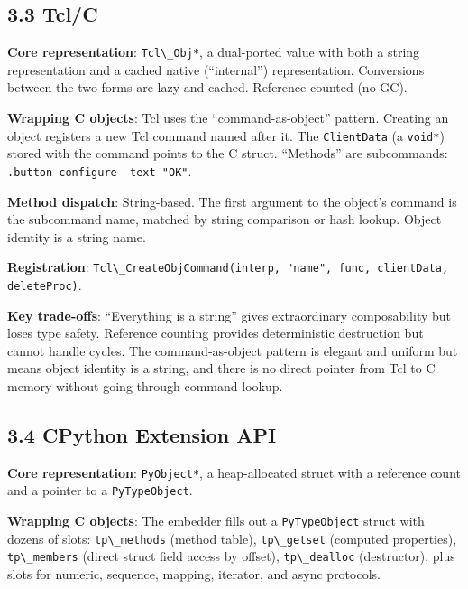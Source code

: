 \documentclass[
  12pt,
]{report}
\newcommand{\passthrough}[1]{#1}
\begin{document}
\subsection{3.3 Tcl/C}\label{tclc}

\textbf{Core representation}: \passthrough{\lstinline!Tcl\_Obj*!}, a
dual-ported value with both a string representation and a cached native
(``internal'') representation. Conversions between the two forms are
lazy and cached. Reference counted (no GC).

\textbf{Wrapping C objects}: Tcl uses the ``command-as-object'' pattern.
Creating an object registers a new Tcl command named after it. The
\passthrough{\lstinline!ClientData!} (a \passthrough{\lstinline!void*!})
stored with the command points to the C struct. ``Methods'' are
subcommands: \passthrough{\lstinline!.button configure -text "OK"!}.

\textbf{Method dispatch}: String-based. The first argument to the
object's command is the subcommand name, matched by string comparison or
hash lookup. Object identity is a string name.

\textbf{Registration}:
\passthrough{\lstinline!Tcl\_CreateObjCommand(interp, "name", func, clientData, deleteProc)!}.

\textbf{Key trade-offs}: ``Everything is a string'' gives extraordinary
composability but loses type safety. Reference counting provides
deterministic destruction but cannot handle cycles. The
command-as-object pattern is elegant and uniform but means object
identity is a string, and there is no direct pointer from Tcl to C
memory without going through command lookup.

\subsection{3.4 CPython Extension API}\label{cpython-extension-api}

\textbf{Core representation}: \passthrough{\lstinline!PyObject*!}, a
heap-allocated struct with a reference count and a pointer to a
\passthrough{\lstinline!PyTypeObject!}.

\textbf{Wrapping C objects}: The embedder fills out a
\passthrough{\lstinline!PyTypeObject!} struct with dozens of slots:
\passthrough{\lstinline!tp\_methods!} (method table),
\passthrough{\lstinline!tp\_getset!} (computed properties),
\passthrough{\lstinline!tp\_members!} (direct struct field access by
offset), \passthrough{\lstinline!tp\_dealloc!} (destructor), plus slots
for numeric, sequence, mapping, iterator, and async protocols.
\end{document}
